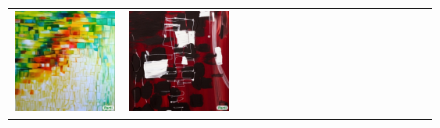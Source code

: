 \begin{figure}[ht!]
\begin{adjustwidth}{-0.8in}{-0.5in}
\begin{tabular}{cccccccccccccccccccc}
\multicolumn{3}{c}{\includegraphics[width=\twobytwocolwidth\textwidth]{figures/cherries/art_light_happy.jpg}} &
\multicolumn{3}{c}{\includegraphics[width=\twobytwocolwidth\textwidth]{figures/cherries/art_black_red_white.jpg}} \\

\end{tabular}
\end{adjustwidth}
\end{figure}
